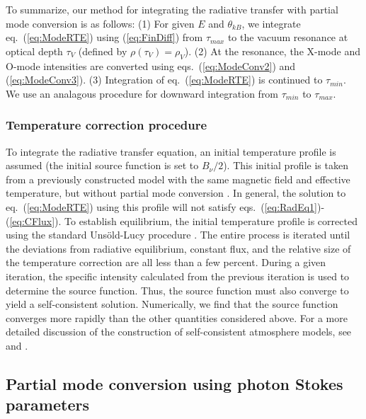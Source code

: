 \documentclass[useAMS,onecolumn,usenatbib,usegraphicx]{mn2e}
\begin{document}
To summarize, our method for integrating the radiative transfer with partial mode conversion 
is as follows: (1) For given $E$ and 
$\theta_{kB}$, we integrate eq.~(\ref{eq:ModeRTE}) using (\ref{eq:FinDiff}) from $\tau_{max}$
to the vacuum resonance at optical depth $\tau_V$ (defined by $\rho(\tau_V)=\rho_V$).
(2) At the resonance, the X-mode and O-mode intensities are converted using eqs.~(\ref{eq:ModeConv2}) and 
(\ref{eq:ModeConv3}).
(3) Integration of eq.~(\ref{eq:ModeRTE}) is continued to $\tau_{min}$.  
We use an analagous procedure for downward integration from
$\tau_{min}$ to $\tau_{max}$. 

\subsubsection{Temperature correction procedure}
\label{subsubsect:TempCorrect}

To integrate the radiative transfer equation, an initial temperature profile is assumed 
(the initial source function is set to $B_{\nu}/2$).  This initial profile is taken 
from a previously constructed model with the same magnetic field and effective temperature, but 
without partial mode conversion \citep[see][]{HoLai03a}.  In general, the solution to eq.~(\ref{eq:ModeRTE})
using this profile will not satisfy eqs.~(\ref{eq:RadEq1})-(\ref{eq:CFlux}).  To establish equilibrium, 
the initial temperature profile is corrected using the standard
Uns\"old-Lucy procedure \citep[][]{Mihalas78a}.  The entire process is iterated until 
the deviations from radiative equilibrium,  constant flux, and 
the relative size of the temperature correction are all less 
than a few percent.  During a given iteration, the specific intensity calculated 
from the previous iteration is 
used to determine the source function.  Thus, the source function must 
also converge to yield a self-consistent solution.  Numerically, we find that the source 
function converges more rapidly than the other quantities considered above.
For a more detailed discussion of the construction of 
self-consistent 
atmosphere models, see \citet[][]{HoLai01a} and \citet[][]{Mihalas78a}.

\subsection{Partial mode conversion using photon Stokes parameters}
\label{subsect:Stokes}
\end{document}

